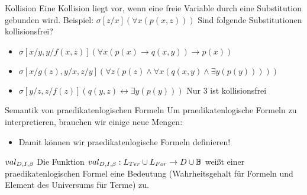 \documentclass[]{beamer}
\begin{document}
\begin{frame}{Kollision}
Eine Kollision liegt vor, wenn eine freie Variable durch eine Substitution gebunden wird. \pause \newline
Beispiel: $\sigma[z/x] (\forall x (p(x, z)))$ \pause \newline
Sind folgende Substitutionen kollisionsfrei?
\begin{itemize}
	\item $\sigma[x/y, y/f(x,z)](\forall x(p(x) \rightarrow q(x,y)) \rightarrow p(x))$
	\item $\sigma[x/g(z), y/x, z/y](\forall z(p(z) \land \forall x(q(x,y) \land \exists y (p(y)))))$
	\item $\sigma[y/z, z/f(z)](q(y,z) \leftrightarrow \exists y(p(y)))$
	\pitem Nur 3 ist kollisionsfrei
\end{itemize}
\end{frame}


\begin{frame}{Semantik von praedikatenlogischen Formeln}
	Um praedikatenlogische Formeln zu interpretieren, brauchen wir einige neue Mengen:
	
	\begin{itemize}
		\pitem Interpretation $(D, I)$\ip, bestehend aus...
		\begin{itemize}
			\pitem Universum $D \neq \emptyset$ mit...
			\begin{itemize}
				\pitem $I(c_i) \in D$ für $c_i \in Const_{PL}$
				\pitem $I(f_i) : D^{ar(f_i)} \rightarrow D$ für $f_i \in Fun_{PL}$
				\pitem $I(R_i) \subseteq D^{ar(R_i)}$ für $R_i \in Rel_{PL}$
				\pitem $I$ weißt also den Komponenten Bedeutungen zu, ``definiert diese''
			\end{itemize}
			
			\pitem Variablenbelegung $\sigma : Var_{PL} \rightarrow D$, z.B. $\sigma(x) := 3, \sigma(y) := 11$
			\begin{itemize}
				\pitem $\sigma$ definiert also Variablenwerte
			\end{itemize}
		\end{itemize}
		
		\bp
		
		\item Damit können wir praedikatenlogische Formeln definieren!
	\end{itemize}
	
	\p
	
	\begin{block}{$val_{D,I,\beta}$}
		Die Funktion $val_{D,I,\beta} : L_{Ter} \cup L_{For} \rightarrow D \cup \mathbb{B}$ weißt einer praedikatenlogischen Formel eine Bedeutung 
		(Wahrheitsgehalt für Formeln und Element des Universums für Terme) zu.
	\end{block}
\end{frame}
\end{document}

